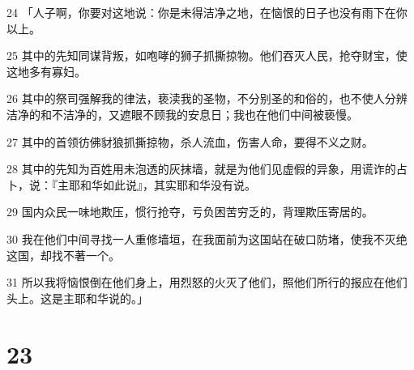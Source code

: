 \par 24 「人子啊，你要对这地说：你是未得洁净之地，在恼恨的日子也没有雨下在你以上。
\par 25 其中的先知同谋背叛，如咆哮的狮子抓撕掠物。他们吞灭人民，抢夺财宝，使这地多有寡妇。
\par 26 其中的祭司强解我的律法，亵渎我的圣物，不分别圣的和俗的，也不使人分辨洁净的和不洁净的，又遮眼不顾我的安息日；我也在他们中间被亵慢。
\par 27 其中的首领彷佛豺狼抓撕掠物，杀人流血，伤害人命，要得不义之财。
\par 28 其中的先知为百姓用未泡透的灰抹墙，就是为他们见虚假的异象，用谎诈的占卜，说：『主耶和华如此说』，其实耶和华没有说。
\par 29 国内众民一味地欺压，惯行抢夺，亏负困苦穷乏的，背理欺压寄居的。
\par 30 我在他们中间寻找一人重修墙垣，在我面前为这国站在破口防堵，使我不灭绝这国，却找不著一个。
\par 31 所以我将恼恨倒在他们身上，用烈怒的火灭了他们，照他们所行的报应在他们头上。这是主耶和华说的。」

\chapter{23}

